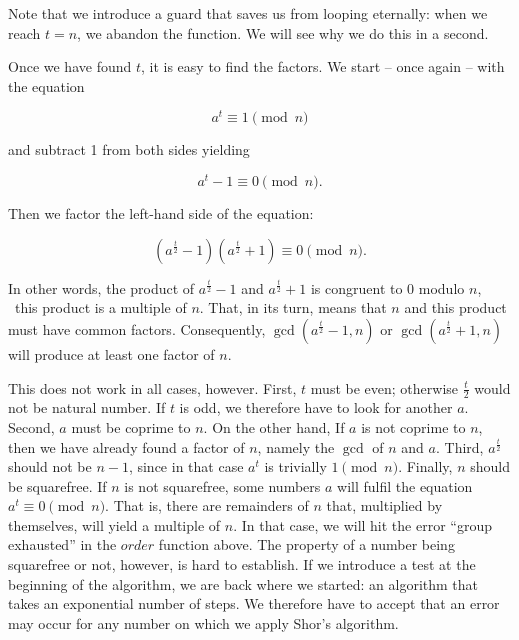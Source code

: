 \documentclass{scrreprt}
\newcommand{\Varid}[1]{\mathit{#1}}
\begin{document}
Note that we introduce a guard 
that saves us from looping eternally:
when we reach $t = n$, we abandon
the function.
We will see why we do this in a second.

Once we have found $t$,
it is easy to find the factors.
We start -- once again -- with the equation

\begin{equation}
a^t \equiv 1 \pmod{n}
\end{equation}

and subtract 1 from both sides yielding

\begin{equation}
a^t - 1 \equiv 0 \pmod{n}.
\end{equation}

Then we factor the left-hand side of the equation:

\begin{equation}
(a^{\frac{t}{2}} - 1)(a^{\frac{t}{2}} + 1) \equiv 0 \pmod{n}.
\end{equation}

In other words,
the product of $a^{\frac{t}{2}} - 1$ and $a^{\frac{t}{2}} + 1$
is congruent to 0 modulo $n$, \ie\
this product is a multiple of $n$.
That, in its turn, means that $n$ and this product
must have common factors. Consequently,
$\gcd(a^{\frac{t}{2}} - 1, n)$ or 
$\gcd(a^{\frac{t}{2}} + 1, n)$
will produce at least one factor of $n$.

This does not work in all cases, however.
First, $t$ must be even;
otherwise $\frac{t}{2}$ would not be natural number.
If $t$ is odd, we therefore have to look for another $a$.
Second, $a$ must be coprime to $n$.
On the other hand, If $a$ is not coprime to $n$,
then we have already found a factor of $n$,
namely the $\gcd$ of $n$ and $a$.
Third, $a^{\frac{t}{2}}$ should not be
$n-1$, since in that case
$a^t$ is trivially $1 \pmod{n}$.
Finally, $n$ should be squarefree.
If $n$ is not squarefree,
some numbers $a$ will fulfil the equation
$a^t \equiv 0 \pmod{n}$.
That is, there are remainders of $n$
that, multiplied by themselves,
will yield a multiple of $n$.
In that case, we will hit the error
``group exhausted'' in the \ensuremath{\Varid{order}} function above.
The property of a number 
being squarefree or not, however,
is hard to establish.
If we introduce a test 
at the beginning of the algorithm,
we are back where we started:
an algorithm that takes 
an exponential number of steps.
We therefore have to accept
that an error may occur for any number
on which we apply Shor's algorithm.
\end{document}
